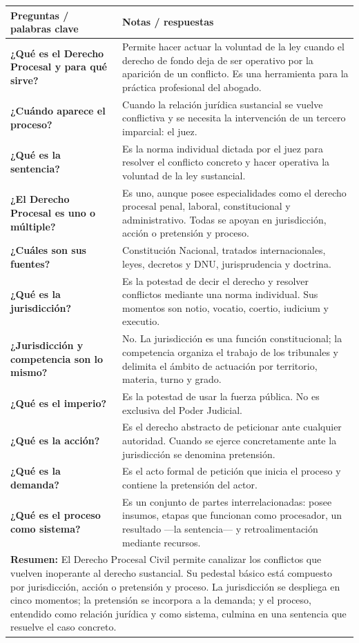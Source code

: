 \documentclass[12pt,oneside]{book}
\begin{document}
\begin{longtable}{p{}p{}}
\toprule
\textbf{Preguntas / palabras clave} & \textbf{Notas / respuestas}\\
\midrule
\textbf{¿Qué es el Derecho Procesal y para qué sirve?} & Permite hacer actuar la voluntad de la ley cuando el derecho de fondo deja de ser operativo por la aparición de un conflicto. Es una herramienta para la práctica profesional del abogado.\\
\midrule
\textbf{¿Cuándo aparece el proceso?} & Cuando la relación jurídica sustancial se vuelve conflictiva y se necesita la intervención de un tercero imparcial: el juez.\\
\midrule
\textbf{¿Qué es la sentencia?} & Es la norma individual dictada por el juez para resolver el conflicto concreto y hacer operativa la voluntad de la ley sustancial.\\
\midrule
\textbf{¿El Derecho Procesal es uno o múltiple?} & Es uno, aunque posee especialidades como el derecho procesal penal, laboral, constitucional y administrativo. Todas se apoyan en jurisdicción, acción o pretensión y proceso.\\
\midrule
\textbf{¿Cuáles son sus fuentes?} & Constitución Nacional, tratados internacionales, leyes, decretos y DNU, jurisprudencia y doctrina.\\
\midrule
\textbf{¿Qué es la jurisdicción?} & Es la potestad de decir el derecho y resolver conflictos mediante una norma individual. Sus momentos son notio, vocatio, coertio, iudicium y executio.\\
\midrule
\textbf{¿Jurisdicción y competencia son lo mismo?} & No. La jurisdicción es una función constitucional; la competencia organiza el trabajo de los tribunales y delimita el ámbito de actuación por territorio, materia, turno y grado.\\
\midrule
\textbf{¿Qué es el imperio?} & Es la potestad de usar la fuerza pública. No es exclusiva del Poder Judicial.\\
\midrule
\textbf{¿Qué es la acción?} & Es el derecho abstracto de peticionar ante cualquier autoridad. Cuando se ejerce concretamente ante la jurisdicción se denomina pretensión.\\
\midrule
\textbf{¿Qué es la demanda?} & Es el acto formal de petición que inicia el proceso y contiene la pretensión del actor.\\
\midrule
\textbf{¿Qué es el proceso como sistema?} & Es un conjunto de partes interrelacionadas: posee insumos, etapas que funcionan como procesador, un resultado —la sentencia— y retroalimentación mediante recursos.\\
\midrule
\multicolumn{2}{p{0.94\textwidth}}{\textbf{Resumen:} El Derecho Procesal Civil permite canalizar los conflictos que vuelven inoperante al derecho sustancial. Su pedestal básico está compuesto por jurisdicción, acción o pretensión y proceso. La jurisdicción se despliega en cinco momentos; la pretensión se incorpora a la demanda; y el proceso, entendido como relación jurídica y como sistema, culmina en una sentencia que resuelve el caso concreto.}\\
\bottomrule
\end{longtable}
\end{document}
